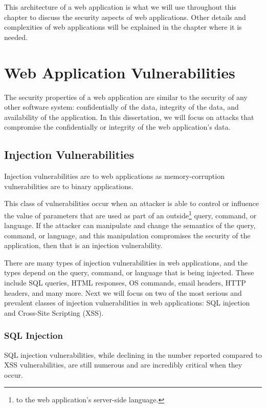 This architecture of a web application is what we will use throughout
this chapter to discuss the security aspects of web applications.
Other details and complexities of web applications will be explained
in the chapter where it is needed.

\section{Web Application Vulnerabilities}

The security properties of a web application are similar to the
security of any other software system: confidentially of the data,
integrity of the data, and availability of the application. In this
dissertation, we will focus on attacks that compromise the
confidentially or integrity of the web application's data.

\subsection{Injection Vulnerabilities}

Injection vulnerabilities are to web applications as memory-corruption
vulnerabilities are to binary applications. 

This class of vulnerabilities occur when an attacker is able to
control or influence the value of parameters that are used as part of
an outside\footnote{to the web application's server-side language.}
query, command, or language. If the attacker can manipulate and change
the semantics of the query, command, or language, and this
manipulation compromises the security of the application, then that is
an injection vulnerability.

There are many types of injection vulnerabilities in web applications,
and the types depend on the query, command, or language that is being
injected. These include SQL queries, HTML responses, OS commands,
email headers, HTTP headers, and many more. Next we will focus on two
of the most serious and prevalent classes of injection vulnerabilities
in web applications: SQL injection and Cross-Site Scripting (XSS).

\subsubsection{SQL Injection}

SQL injection vulnerabilities, while declining in the number reported
compared to XSS vulnerabilities, are still numerous and are incredibly
critical when they occur.

